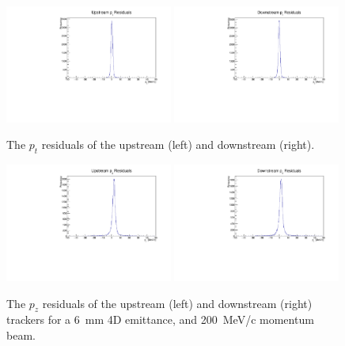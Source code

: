   
  \begin{figure}[p]
    \begin{center}
      \includegraphics[width=0.49\textwidth, angle=0]{08-Performance/upstream_residual_pt.pdf}
      \includegraphics[width=0.49\textwidth, angle=0]{08-Performance/downstream_residual_pt.pdf}
      \caption{\label{fig:PtResidKalman} The $p_t$ residuals of the upstream (left) and downstream (right).}
    \end{center}
  \end{figure}
  
   \begin{figure}[p]
    \begin{center}
      \includegraphics[width=0.49\textwidth, angle=0]{08-Performance/upstream_residual_pz.pdf}
      \includegraphics[width=0.49\textwidth, angle=0]{08-Performance/downstream_residual_pz.pdf}
      \caption{\label{fig:PzResidKalman} The $p_z$ residuals of the upstream (left) and downstream (right) trackers for a 6~mm 4D emittance, and 200~MeV/c momentum beam.}
    \end{center}
  \end{figure}
  
